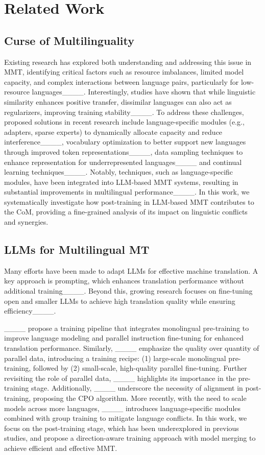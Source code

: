 \section{Related Work}
\subsection{Curse of Multilinguality}
Existing research has explored both understanding and addressing this issue in MMT, identifying critical factors such as resource imbalances, limited model capacity, and complex interactions between language pairs, particularly for low-resource languages____. Interestingly, studies have shown that while linguistic similarity enhances positive transfer, dissimilar languages can also act as regularizers, improving training stability____. 
To address these challenges, proposed solutions in recent research include language-specific modules (e.g., adapters, sparse experts) to dynamically allocate capacity and reduce interference____, vocabulary optimization to better support new languages through improved token representations____, data sampling techniques to enhance representation for underrepresented languages____ and continual learning techniques____. Notably, techniques, such as language-specific modules, have been integrated into LLM-based MMT systems, resulting in substantial improvements in multilingual performance____. In this work, we systematically investigate how post-training in LLM-based MMT contributes to the CoM, providing a fine-grained analysis of its impact on linguistic conflicts and synergies.
\subsection{LLMs for Multilingual MT}
Many efforts have been made to adapt LLMs for effective machine translation. A key approach is prompting, which enhances translation performance without additional training____. Beyond this, growing research focuses on fine-tuning open and smaller LLMs to achieve high translation quality while ensuring efficiency____.

____ propose a training pipeline that integrates monolingual pre-training to improve language modeling and parallel instruction fine-tuning for enhanced translation performance. Similarly, ____ emphasize the quality over quantity of parallel data, introducing a training recipe: (1) large-scale monolingual pre-training, followed by (2) small-scale, high-quality parallel fine-tuning. Further revisiting the role of parallel data, ____ highlights its importance in the pre-training stage. Additionally, ____ underscore the necessity of alignment in post-training, proposing the CPO algorithm. More recently, with the need to scale models across more languages, ____ introduces language-specific modules combined with group training to mitigate language conflicts. In this work, we focus on the post-training stage, which has been underexplored in previous studies, and propose a direction-aware training approach with model merging to achieve efficient and effective MMT.